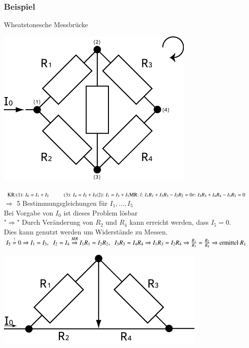 \documentclass[11pt]{article}
\begin{document}
	\subsubsection{Beispiel}Wheatstonesche Messbrücke
	\begin{center}
		\includegraphics[width=0.5\linewidth]{skizzen/15/15_4-6/15_5B4}
	\end{center}
	\begin{math}
		\text{KR:} \\
		\text{(1): } I_0 = I_1 + I_2 \hspace{1cm} \text{(3): } I_4 = I_2 + I_5\\
		\text{(2): } I_1 = I_3 + I_5 \\
		\hfill \\
		\text{MR: } \\
		\text{\emph{l}: } I_1R_1+I_5R_5-I_2R_2=0 \\
		\text{\emph{r}: } I_3R_3+I_4R_4-I_5R_5=0 
	\end{math}
	$ \Rightarrow $ 5 Bestimmungsgleichungen für $ I_1,...,I_5 $ \\
	Bei Vorgabe von $ I_0 $ ist dieses Problem lösbar \\
	"$ \Rightarrow $" Durch Veränderung von $ R_2 $ und $ R_4 $ kann erreicht werden, dass $ I_5=0 $.\\
	Dies kann genutzt werden um Widerstände zu Messen.\\
	\begin{math}
		I_5 \overset{!}{=} 0 \Rightarrow I_1 = I_3,\hspace{2mm} I_2 = I_4 \\
		\overset{MR}{\Rightarrow} I_1 R_1 = I_2 R_2,\hspace{2mm} I_3 R_3 = I_4 R_4 \Rightarrow I_1 R_3 = I_2 R_4 \\
		\Rightarrow \frac{R_1}{R_3} = \frac{R_2}{R_4} \Rightarrow \text{ermittel } R_1
	\end{math}

	\begin{center}
		\includegraphics[width=0.5\linewidth]{skizzen/15/15_4-6/15_5B5}
	\end{center}

	
	
	
				 
\end{document}
